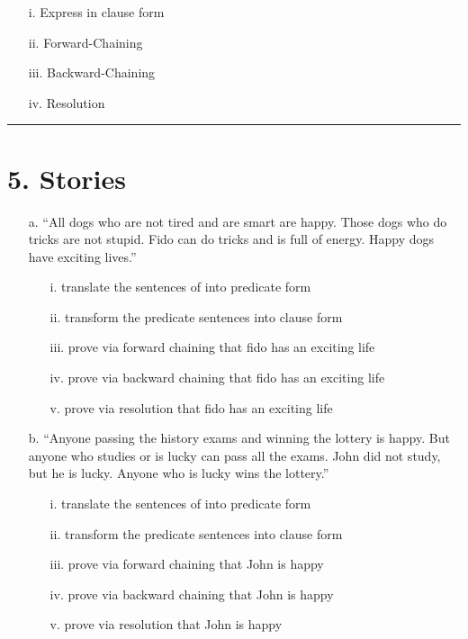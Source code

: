 \documentclass[11pt]{article}
\begin{document}
\begin{flushleft}
\begin{enumerate}
        \begin{enumerate}
            \item[i.] Express in clause form
            \item[ii.] Forward-Chaining
            \item[iii.] Backward-Chaining
            \item[iv.] Resolution
        \end{enumerate}

\end{enumerate}

\rule[0.1pt]{40em}{1.0pt}

\section*{5. Stories}
\begin{enumerate}

    \item[a.] “All dogs who are not tired and are smart are happy.  Those dogs
        who do tricks are not stupid.  Fido can do tricks and is full of
        energy.  Happy dogs have exciting lives.”

        \begin{enumerate}
            \item[i.] translate the sentences of into predicate form
            \item[ii.] transform the predicate sentences into clause form
            \item[iii.] prove via forward chaining that fido has an exciting life
            \item[iv.] prove via backward chaining that fido has an exciting life
            \item[v.] prove via resolution that fido has an exciting life
        \end{enumerate}

    \item[b.] “Anyone passing the history exams and winning the lottery is
        happy.  But anyone who studies or is lucky can pass all the exams.
        John did not study, but he is lucky.  Anyone who is lucky wins the
        lottery.”  

        \begin{enumerate}
            \item[i.] translate the sentences of into predicate form
            \item[ii.] transform the predicate sentences into clause form
            \item[iii.] prove via forward chaining that John is happy
            \item[iv.] prove via backward chaining that John is happy
            \item[v.] prove via resolution that John is happy
        \end{enumerate}

\end{enumerate}

\end{flushleft}
\end{document}

